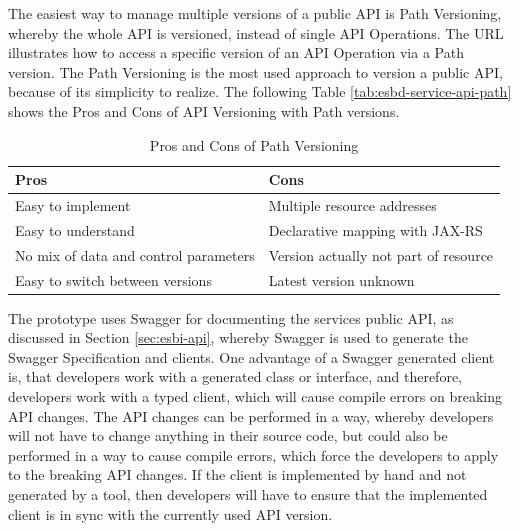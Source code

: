 The easiest way to manage multiple versions of a public API is Path Versioning, whereby the whole API is versioned, instead of single API Operations. The URL  illustrates how to access a specific version of an API Operation via a Path version. The Path Versioning is the most used approach to version a public API, because of its simplicity to realize.  The following Table \vref{tab:esbd-service-api-path} shows the Pros and Cons of API Versioning with Path versions.

{\renewcommand{\arraystretch}{1.2}%
	\begin{table}[h]
		\begin{tabularx}{\textwidth}{ X|X }	
			\textbf{Pros}                         & \textbf{Cons}                         \\  \hline
			Easy to implement                     & Multiple resource addresses           \\
			Easy to understand                    & Declarative mapping with JAX-RS       \\  
			No mix of data and control parameters & Version actually not part of resource \\
			Easy to switch between versions       & Latest version unknown                \\ \hline
		\end{tabularx}
		\caption{Pros and Cons of Path Versioning}
		\label{tab:esbd-service-api-path}
\end{table}}

The prototype uses Swagger for documenting the services public API, as discussed in Section \vref{sec:esbi-api}, whereby Swagger is used to generate the Swagger Specification and clients. One advantage of a Swagger generated client is, that developers work with a generated class or interface, and therefore, developers work with a typed client, which will cause compile errors on breaking API changes. The API changes can be performed in a way, whereby developers will not have to change anything in their source code, but could also be performed in a way to cause compile errors, which force the developers to apply to the breaking API changes. If the client is implemented by hand and not generated by a tool, then developers will have to ensure that the implemented client is in sync with the currently used API version.

